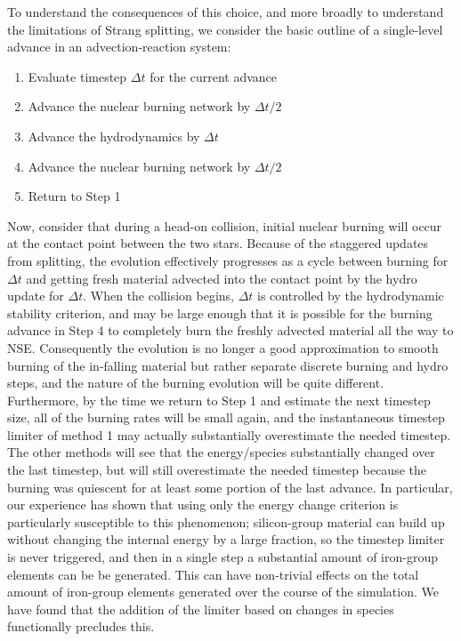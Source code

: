 \documentclass[twocolumn,numberedappendix]{../aastex6}
\begin{document}
To understand the consequences of this choice, and more broadly to 
understand the limitations of Strang splitting, we consider the 
basic outline of a single-level advance in an advection-reaction system:
\begin{enumerate}
  \item Evaluate timestep $\Delta t$ for the current advance
  \item Advance the nuclear burning network by $\Delta t / 2$
  \item Advance the hydrodynamics by $\Delta t$
  \item Advance the nuclear burning network by $\Delta t / 2$
  \item Return to Step 1
\end{enumerate}
Now, consider that during a head-on collision, initial nuclear burning 
will occur at the contact point between the two stars. Because of 
the staggered updates from splitting, the evolution effectively progresses 
as a cycle between burning for $\Delta t$ and getting fresh material 
advected into the contact point by the hydro update for $\Delta t$. 
When the collision begins, $\Delta t$ is controlled by the hydrodynamic 
stability criterion, and may be large enough that it is possible for 
the burning advance in Step 4 to completely burn the freshly advected 
material all the way to NSE. Consequently the evolution is no longer 
a good approximation to smooth burning of the in-falling material but
rather separate discrete burning and hydro steps, and the nature of 
the burning evolution will be quite different. Furthermore, by the 
time we return to Step 1 and estimate the next timestep size, all 
of the burning rates will be small again, and the instantaneous 
timestep limiter of method 1 may actually substantially overestimate 
the needed timestep. The other methods will see that the energy/species  
substantially changed over the last timestep, but will still 
overestimate the needed timestep because the burning was quiescent
for at least some portion of the last advance. In particular, our 
experience has shown that using only the energy change criterion
is particularly susceptible to this phenomenon; silicon-group 
material can build up without changing the internal energy by a 
large fraction, so the timestep limiter is never triggered, and 
then in a single step a substantial amount of iron-group elements 
can be be generated. This can have non-trivial effects on the 
total amount of iron-group elements generated over the course of
the simulation. We have found that the addition of the 
limiter based on changes in species functionally precludes this.
\end{document}
